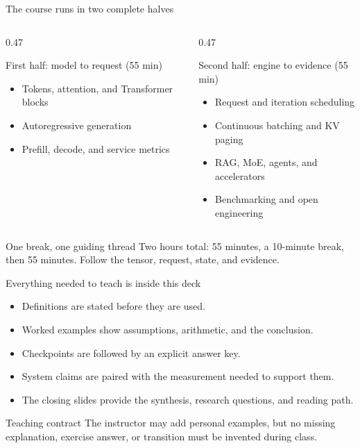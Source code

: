 \documentclass[aspectratio=169,11pt]{beamer}
\begin{document}
\begin{frame}{The course runs in two complete halves}
  \footnotesize
  \begin{columns}[T,totalwidth=\textwidth]
    \begin{column}{0.47\textwidth}
      \begin{block}{First half: model to request (55 min)}
        \begin{itemize}
          \item Tokens, attention, and Transformer blocks
          \item Autoregressive generation
          \item Prefill, decode, and service metrics
        \end{itemize}
      \end{block}
    \end{column}
    \begin{column}{0.47\textwidth}
      \begin{block}{Second half: engine to evidence (55 min)}
        \begin{itemize}
          \item Request and iteration scheduling
          \item Continuous batching and KV paging
          \item RAG, MoE, agents, and accelerators
          \item Benchmarking and open engineering
        \end{itemize}
      \end{block}
    \end{column}
  \end{columns}
  \vspace{0.10cm}
  \begin{block}{One break, one guiding thread}
    Two hours total: 55 minutes, a 10-minute break, then 55 minutes. Follow the tensor, request, state, and evidence.
  \end{block}
\end{frame}

\begin{frame}{Everything needed to teach is inside this deck}
  \begin{itemize}
    \item Definitions are stated before they are used.
    \item Worked examples show assumptions, arithmetic, and the conclusion.
    \item Checkpoints are followed by an explicit answer key.
    \item System claims are paired with the measurement needed to support them.
    \item The closing slides provide the synthesis, research questions, and reading path.
  \end{itemize}
  \vspace{0.30cm}
  \begin{block}{Teaching contract}
    The instructor may add personal examples, but no missing explanation, exercise answer, or transition must be invented during class.
  \end{block}
\end{frame}
\end{document}
